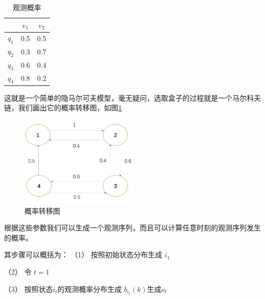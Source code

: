 \documentclass[a4paper,12pt]{ctexart}     %
\begin{document}
	\begin{table}[htbp]\songti{} 
		
		\begin{center}
			\renewcommand\arraystretch{2}         %
			\caption{观测概率 \label{tab:guance}} 
			{
				
				\begin{tabular}{|c|c|c|}\hline   %
					
					\small &$ v_1 $&$ v_2$\\\hline   %
					$ q_1 $&0.5&0.5\\\hline
					$ q_2 $&0.3&0.7\\\hline
					$ q_3 $&0.6&0.4\\\hline
					$ q_4 $&0.8&0.2\\\hline
				\end{tabular}
			}
		\end{center}
	\end{table}
	
	
	这就是一个简单的隐马尔可夫模型，毫无疑问，选取盒子的过程就是一个马尔科夫链，我们画出它的概率转移图，如图\ref{fig:zhuanyi}
	\begin{figure}[H] %
		\centering %
		\includegraphics[width=0.51\textwidth]{概率转移图.png} %
		\caption{概率转移图 \label{fig:zhuanyi}} %
	\end{figure}

	根据这些参数我们可以生成一个观测序列，而且可以计算任意时刻的观测序列发生的概率。
	
	其步骤可以概括为：
	（1） 按照初始状态分布生成 $ i_1 $
	
	（2） 令  $t=1 $
	
	（3）  按照状态$ i_t $的观测概率分布生成 $ b_{i_t}(k) $生成$ o_t $
	
\end{document}
